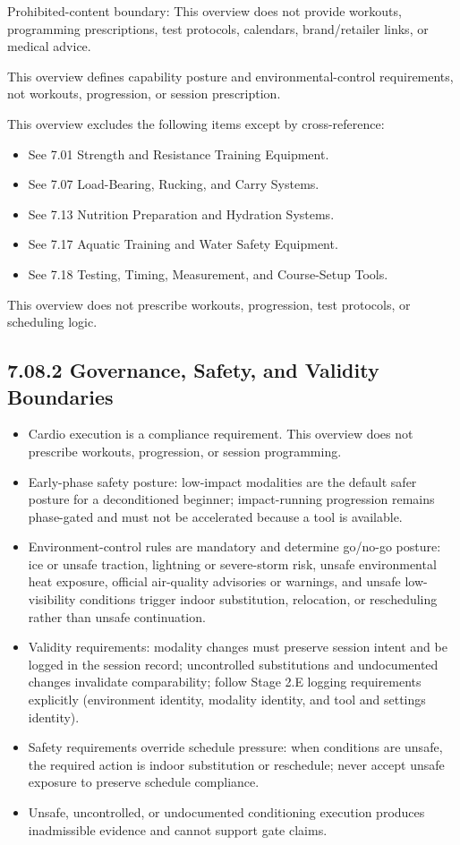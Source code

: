 \documentclass[10pt]{article}
\begin{document}
Prohibited-content boundary: This overview does not provide workouts, programming prescriptions, test protocols, calendars, brand/retailer links, or medical advice.

This overview defines capability posture and environmental-control requirements, not workouts, progression, or session prescription.

This overview excludes the following items except by cross-reference:

\begin{itemize}
\item See 7.01 Strength and Resistance Training Equipment.
\item See 7.07 Load-Bearing, Rucking, and Carry Systems.
\item See 7.13 Nutrition Preparation and Hydration Systems.
\item See 7.17 Aquatic Training and Water Safety Equipment.
\item See 7.18 Testing, Timing, Measurement, and Course-Setup Tools.
\end{itemize}

This overview does not prescribe workouts, progression, test protocols, or scheduling logic.

\subsection*{7.08.2 Governance, Safety, and Validity Boundaries}
{}

\begin{itemize}
\item Cardio execution is a compliance requirement. This overview does not prescribe workouts, progression, or session programming.
\item Early-phase safety posture: low-impact modalities are the default safer posture for a deconditioned beginner; impact-running progression remains phase-gated and must not be accelerated because a tool is available.
\item Environment-control rules are mandatory and determine go/no-go posture: ice or unsafe traction, lightning or severe-storm risk, unsafe environmental heat exposure, official air-quality advisories or warnings, and unsafe low-visibility conditions trigger indoor substitution, relocation, or rescheduling rather than unsafe continuation.
\item Validity requirements: modality changes must preserve session intent and be logged in the session record; uncontrolled substitutions and undocumented changes invalidate comparability; follow Stage 2.E logging requirements explicitly (environment identity, modality identity, and tool and settings identity).
\item Safety requirements override schedule pressure: when conditions are unsafe, the required action is indoor substitution or reschedule; never accept unsafe exposure to preserve schedule compliance.
\item Unsafe, uncontrolled, or undocumented conditioning execution produces inadmissible evidence and cannot support gate claims.
\end{itemize}
\end{document}
